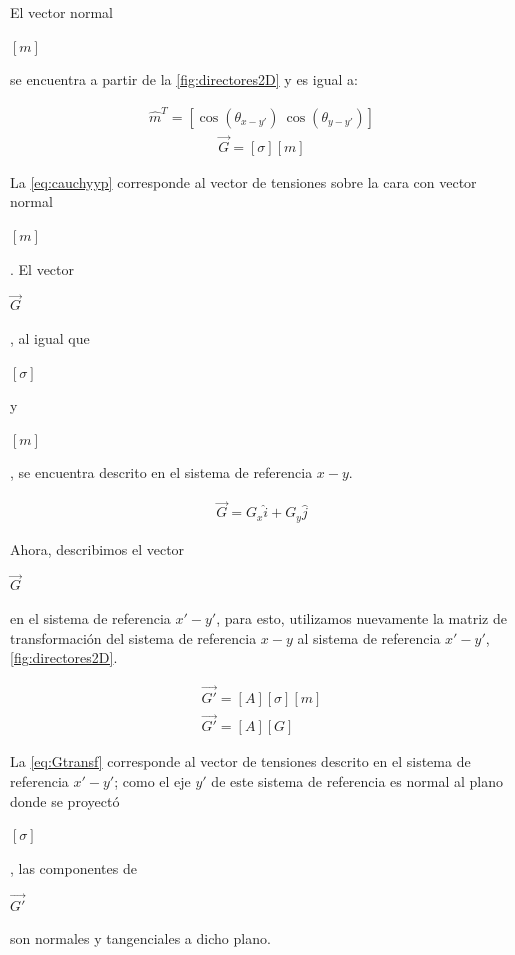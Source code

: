 \documentclass[12pt,letterpaper, twoside, openany]{article}
\begin{document}
%
El vector normal \begin{large} $\left[ m \right]$\end{large} se encuentra a partir de la \cref{fig:directores2D} y es igual a:
%
\begin{large}
	\begin{align}
		\hat{m}^T=\left[ \cos \left( \theta_{x-y'} \right)\ \cos \left( \theta_{y-y'} \right)\right]
		\label{eq:normalm}
	\end{align}
%
	\begin{align}
		\overset{\rightarrow}{G}=\left[ \sigma \right] \left[m\right]
		\label{eq:cauchyyp}
	\end{align}
\end{large}
%
La \cref{eq:cauchyyp} corresponde al vector de tensiones sobre la cara con vector normal \begin{large} $\left[ m \right]$\end{large}. El vector \begin{large} $\overset{\rightarrow}{G}$\end{large}, al igual que  \begin{large} $\left[ \sigma \right]$\end{large} y \begin{large} $\left[ m \right]$\end{large}, se encuentra descrito en el sistema de referencia $x-y$.
%
\begin{large}
	\begin{align}
		\overset{\rightarrow}{G}= G_x \hat{i} + G_y \hat{j}
		\label{eq:Gcomp}
	\end{align}
\end{large}
%
Ahora, describimos el vector \begin{large} $\overset{\rightarrow}{G}$\end{large} en el sistema de referencia $x'-y'$, para esto, utilizamos nuevamente la matriz de transformación del sistema de referencia $x-y$ al sistema de referencia $x'-y'$, \cref{fig:directores2D}.
%
 \begin{large}
	\begin{align}
		\overset{\rightarrow}{G'}= \left[ A \right] \left[ \sigma \right] \left[ m\right]\label{eq:Gtransf0}\\
		\overset{\rightarrow}{G'}= \left[ A \right] \left[ G \right]
		\label{eq:Gtransf}
	\end{align}
\end{large}
%
La \cref{eq:Gtransf} corresponde al vector de tensiones descrito en el sistema de referencia $x'-y'$; como el eje $y'$ de este sistema de referencia es normal al plano donde se proyectó \begin{large} $\left[ \sigma \right]$\end{large}, las componentes de \begin{large} $\overset{\rightarrow}{G'}$\end{large} son normales y tangenciales a dicho plano.
\end{document}
